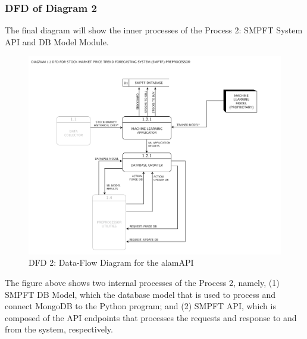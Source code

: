 \subsubsection{DFD of Diagram 2}
\label{subsubsec:dfd2}
The final diagram will show the inner processes of 
the Process 2: SMPFT System API and DB Model Module.
\begin{figure}[ht]
    \centering
    \includegraphics[width=1\textwidth]{./assets/Data Flow Diagram-05.png}
    \caption{DFD 2: Data-Flow Diagram for the alamAPI}
    \label{fig:dfd2}
\end{figure}
\FloatBarrier
\vspace{0.5cm}
The figure above shows two internal processes of the Process 2, namely, 
(1) SMPFT DB Model, which the database model that is used to process and 
connect MongoDB to the Python program; and 
(2) SMPFT API, which is composed of the API endpoints that processes 
the requests and response to and from the system, respectively.